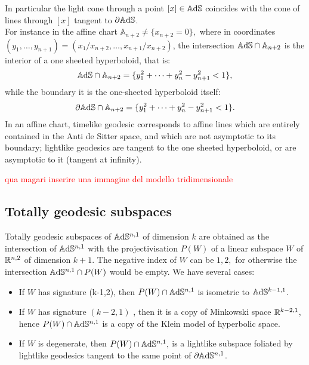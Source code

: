 In particular the light cone through a point $[x]\in \mathbb{A}\mathrm{d}\mathbb{S}$ coincides with the cone of lines through $[x]$ tangent to $\partial \mathbb{A}\mathrm{d}\mathbb{S}$.\\ For instance in the affine chart $\mathbb{A}_{n+2}\neq\{x_{n+2}=0\},$ where in coordinates $(y_1, \dots, y_{n+1})=(x_1/x_{n+2},\dots, x_{n+1}/x_{n+2})$, the intersection $\mathbb{A}\mathrm{d}\mathbb{S}\cap\mathbb{A}_{n+2}$ is the interior of a one sheeted hyperboloid, that is: 
\[
    \mathbb{A}\mathrm{d}\mathbb{S}\cap\mathbb{A}_{n+2}=\{y_1^2+\dots+y_n^2-y_{n+1}^2<1\},
\]
 while the boundary it is the one-sheeted hyperboloid itself: 
 \[
    \partial\mathbb{A}\mathrm{d}\mathbb{S}\cap\mathbb{A}_{n+2}=\{y_1^2+\dots+y_n^2-y_{n+1}^2<1\}.
\]
In an affine chart, timelike geodesic corresponds to affine lines which are entirely contained in the Anti de Sitter space, and which are not asymptotic to its boundary; lightlike geodesics are tangent to the one sheeted hyperboloid, or are asymptotic to it (tangent at infinity).

\textcolor{red}{qua magari inserire una immagine del modello tridimensionale}


\subsection{Totally geodesic subspaces} Totally geodesic subspaces of $\mathbb{A}\mathrm{d}\mathbb{S}^{n,1}$ of dimension $k$ are obtained as the intersection of $\mathbb{A}\mathrm{d}\mathbb{S}^{n,1}$ with the projectivisation $P(W)$ of a linear subspace $W$ of $\mathbb{R}^{n,2}$ of dimension $k+1.$ The negative index of $W$ can be $1, 2,$ for otherwise the intersection $\mathbb{A}\mathrm{d}\mathbb{S}^{n,1}\cap P(W)$ would be empty. We have several cases: 
\begin{itemize}
    \item If $W$ has signature (k-1,2), then $P(W)\cap \mathbb{A}\mathrm{d}\mathbb{S}^{n,1}$ is isometric to $\mathbb{A}\mathrm{d}\mathbb{S}^{k-1,1}$. 
    \item If $W$ has signature $(k-2, 1)$ , then it is a copy of Minkowski space $\mathbb{R}^{k-2,1}$, hence $P(W)\cap \mathbb{A}\mathrm{d}\mathbb{S}^{n,1}$ is a copy of the Klein model of hyperbolic space. 
    \item If $W$ is degenerate, then $P(W)\cap \mathbb{A}\mathrm{d}\mathbb{S}^{n,1},$ is a lightlike subspace foliated by lightlike geodesics tangent to the same point of $\partial\mathbb{A}\mathrm{d}\mathbb{S}^{n,1}$. 
\end{itemize}  

